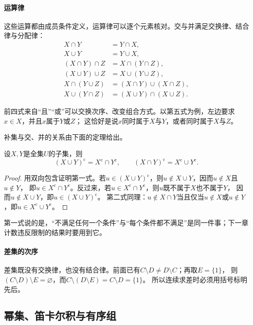 \paragraph{运算律}
这些运算都由成员条件定义，运算律可以逐个元素核对。交与并满足交换律、结合律与分配律：
\begin{align*}
 X\cap Y&=Y\cap X,\\
 X\cup Y&=Y\cup X,\\
 (X\cap Y)\cap Z&=X\cap(Y\cap Z),\\
 (X\cup Y)\cup Z&=X\cup(Y\cup Z),\\
 X\cap(Y\cup Z)&=(X\cap Y)\cup(X\cap Z),\\
 X\cup(Y\cap Z)&=(X\cup Y)\cap(X\cup Z).
\end{align*}

前四式来自“且”“或”可以交换次序、改变组合方式。以第五式为例，左边要求$x\in X$，并且$x$属于$Y$或$Z$；
这恰好是说$x$同时属于$X$与$Y$，或者同时属于$X$与$Z$。

补集与交、并的关系由下面的定理给出。
\begin{theorem}[De Morgan律]
\label{thm:sets-de-morgan}
设$X,Y$是全集$U$的子集，则
\begin{equation}
 (X\cup Y)^{\mathrm c}=X^{\mathrm c}\cap Y^{\mathrm c},\qquad
 (X\cap Y)^{\mathrm c}=X^{\mathrm c}\cup Y^{\mathrm c}.
 \label{eq:prelim-de-morgan-two-sets}
\end{equation}
\end{theorem}
\begin{proof}
用双向包含证明第一式。若$u\in(X\cup Y)^{\mathrm c}$，则$u\notin X\cup Y$，因而$u\notin X$且$u\notin Y$，
即$u\in X^{\mathrm c}\cap Y^{\mathrm c}$。反过来，若$u\in X^{\mathrm c}\cap Y^{\mathrm c}$，则$u$既不属于$X$也不属于$Y$，
因而$u\notin X\cup Y$，即$u\in(X\cup Y)^{\mathrm c}$。
第二式同理：$u\notin X\cap Y$当且仅当$u\notin X$或$u\notin Y$，即$u\in X^{\mathrm c}\cup Y^{\mathrm c}$。
\end{proof}
第一式说的是，“不满足任何一个条件”与“每个条件都不满足”是同一件事；下一章计数违反限制的结果时要用到它。

\paragraph{差集的次序}
差集既没有交换律，也没有结合律。前面已有$C\setminus D\neq D\setminus C$；再取$E=\{1\}$，
则$(C\setminus D)\setminus E=\varnothing$，而$C\setminus(D\setminus E)=C\setminus D=\{1\}$。
所以连续求差时必须用括号标明先后。

\subsection{幂集、笛卡尔积与有序组}
\label{sec:sets-power-sets-products}

